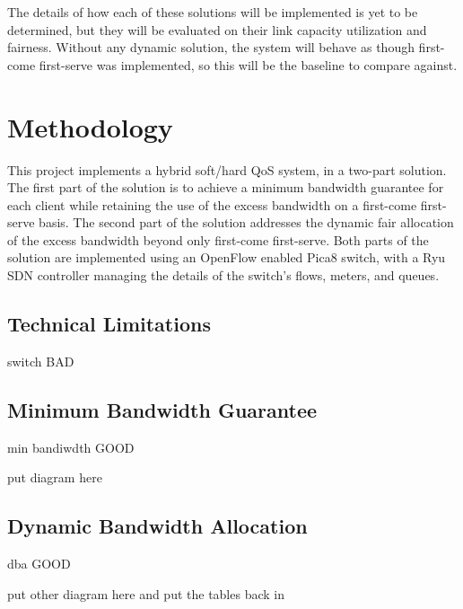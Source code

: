 \documentclass[accepted,single]{gipaper}
\begin{document}
The details of how each of these solutions will be implemented is yet to be determined, but they will be evaluated on their link capacity utilization and fairness. Without any dynamic solution, the system will behave as though first-come first-serve was implemented, so this will be the baseline to compare against.


\section{Methodology}
\label{methodology}

This project implements a hybrid soft/hard QoS system, in a two-part solution. The first part of the solution is to achieve a minimum bandwidth guarantee for each client while retaining the use of the excess bandwidth on a first-come first-serve basis. The second part of the solution addresses the dynamic fair allocation of the excess bandwidth beyond only first-come first-serve. Both parts of the solution are implemented using an OpenFlow enabled Pica8 switch, with a Ryu SDN controller managing the details of the switch's flows, meters, and queues.

\subsection{Technical Limitations}
\label{tech_limitations}

switch BAD



\subsection{Minimum Bandwidth Guarantee}
\label{min_bandwidth}

min bandiwdth GOOD

put diagram here

\subsection{Dynamic Bandwidth Allocation}
\label{min_bandwidth}

dba GOOD

put other diagram here and put the tables back in

\end{document}
